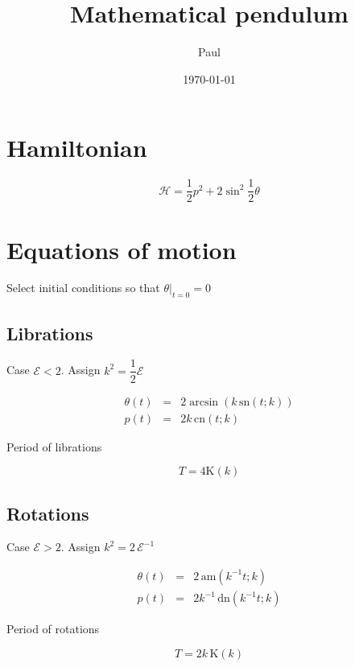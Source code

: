 \documentclass{article}
\title{Mathematical pendulum}
\author{Paul}
\date{\today}
\begin{document}
\maketitle

\section{Hamiltonian}

\begin{equation}
\mathcal{H} = \dfrac{1}{2} p^2 + 2 \sin^2 \dfrac{1}{2} \theta
\end{equation}

\section{Equations of motion}

Select initial conditions so that $\theta\Big\vert_{t=0} = 0$

\subsection{Librations}

Case $\mathcal{E} < 2$. Assign $k^2 = \dfrac{1}{2} \mathcal{E}$

\begin{eqnarray}
\theta(t) & = & 2 \arcsin (k \, \mathrm{sn}(t ; k)) \\
p(t) & = & 2 k \, \mathrm{cn}(t ; k)
\end{eqnarray}

Period of librations

\begin{equation}
T = 4 \mathrm{K}(k)
\end{equation}

\subsection{Rotations}

Case $\mathcal{E} > 2$. Assign $k^2 = 2 \, \mathcal{E}^{-1}$

\begin{eqnarray}
\theta(t) & = & 2 \, \mathrm{am} (k^{-1} t ; k) \\
p(t) & = & 2 k^{-1} \, \mathrm{dn}(k^{-1} t ; k)
\end{eqnarray}

Period of rotations

\begin{equation}
T = 2 k \, \mathrm{K}(k)
\end{equation}
\end{document}
